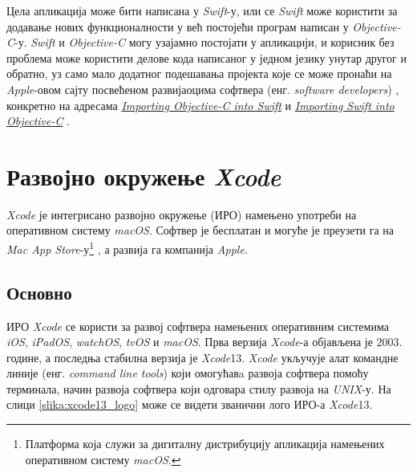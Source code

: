 \documentclass[12pt,oneside]{memoir}
\begin{document}
\indent Цела апликација може бити написана у \textit{Swift}-у, или се \textit{Swift} може користити за додавање нових функционалности у већ постојећи програм написан у \textit{Objective-C}-у. \textit{Swift} и \textit{Objective-C} могу узајамно постојати у апликацији, и корисник без проблема може користити делове кода написаног у једном језику унутар другог и обратно, уз само мало додатног подешавања пројекта које се може пронаћи на \textit{Apple}-овом сајту посвећеном развијаоцима софтвера (енг. \textit{software developers}) \cite{Apple_Developer}, конкретно на адресама \href{https://developer.apple.com/documentation/swift/imported_c_and_objective-c_apis/importing_objective-c_into_swift}{\textit{Importing Objective-C into Swift}} \cite{Importing_Objective-C_into_Swift} и \href{https://developer.apple.com/documentation/swift/imported_c_and_objective-c_apis/importing_swift_into_objective-c}{\textit{Importing Swift into Objective-C}} \cite{Importing_Swift_into_Objective-C}.

\section{Развојно окружење \textit{Xcode}}
\label{sec:Xcode}

\indent \textit{Xcode} је интегрисано развојно окружење (ИРО) намењено употреби на оперативном систему \textit{macOS}. Софтвер је бесплатан и могуће је преузети га на \textit{Mac App Store}-у\footnote{Платформа која служи за дигиталну дистрибуцију апликација намењених оперативном систему \textit{macOS}.} \cite{Xcode}, а развија га компанија \textit{Apple}.

\subsection{Основно}

\indent ИРО \textit{Xcode} се користи за развој софтвера намењених оперативним системима \textit{iOS}, \textit{iPadOS}, \textit{watchOS}, \textit{tvOS} и \textit{macOS}. Прва верзија \textit{Xcode}-а објављена је 2003. године, а последња стабилна верзија је \textit{Xcode}13. \textit{Xcode} укључује алат командне линије (енг. \textit{command line tools}) који омогућавa развоја софтвера помоћу терминала, начин развоја софтвера који одговара стилу развоја на \textit{UNIX}-у. На слици \ref{slika:xcode13_logo} може се видети званични лого ИРО-а \textit{Xcode}13.
\end{document}
